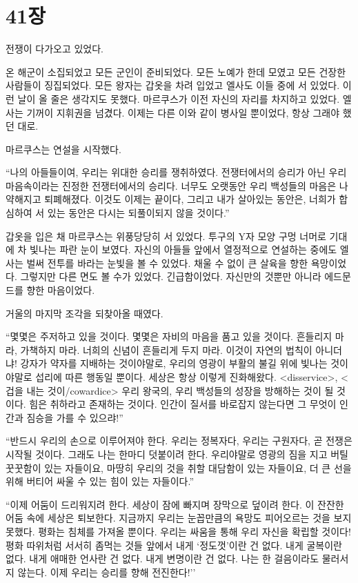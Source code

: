 ﻿
\chapter[41장  ~~][41장\hspace*{.5em}~~]{41장 \ ~~}



전쟁이 다가오고 있었다.

온 해군이 소집되었고 모든 군인이 준비되었다. 모든 노예가 한데 모였고 모든 건장한 사람들이 징집되었다. 모든 왕자는 갑옷을 차려 입었고 엘사도 이들 중에 서 있었다. 이런 날이 올 줄은 생각지도 못했다. 마르쿠스가 이전 자신의 자리를 차지하고 있었다. 엘사는 기꺼이 지휘권을 넘겼다. 이제는 다른 이와 같이 병사일 뿐이었다, 항상 그래야 했던 대로.

마르쿠스는 연설을 시작했다.

``나의 아들들이여, 우리는 위대한 승리를 쟁취하였다. 전쟁터에서의 승리가 아닌 우리 마음속이라는 진정한 전쟁터에서의 승리다. 너무도 오랫동안 우리 백성들의 마음은 나약해지고 퇴폐해졌다. 이것도 이제는 끝이다, 그리고 내가 살아있는 동안은, 너희가 합심하여 서 있는 동안은 다시는 되풀이되지 않을 것이다.''

갑옷을 입은 채 마르쿠스는 위풍당당히 서 있었다. 투구의 Y자 모양 구멍 너머로 기대에 차 빛나는 파란 눈이 보였다. 자신의 아들들 앞에서 열정적으로 연설하는 중에도 엘사는 벌써 전투를 바라는 눈빛을 볼 수 있었다. 채울 수 없이 큰 살육을 향한 욕망이었다. 그렇지만 다른 면도 볼 수가 있었다. 긴급함이었다. 자신만의 것뿐만 아니라 에드문드를 향한 마음이었다.

거울의 마지막 조각을 되찾아올 때였다.

``몇몇은 주저하고 있을 것이다. 몇몇은 자비의 마음을 품고 있을 것이다. 흔들리지 마라, 가책하지 마라. 너희의 신념이 흔들리게 두지 마라. 이것이 자연의 법칙이 아니더냐! 강자가 약자를 지배하는 것이야말로, 우리의 영광이 부활의 불길 위에 빛나는 것이야말로 섭리에 따른 행동일 뿐이다. 세상은 항상 이렇게 진화해왔다. <disservice>, <겁을 내는 것이/cowardice> 우리 왕국의, 우리 백성들의 성장을 방해하는 것이 될 것이다. 힘은 취하라고 존재하는 것이다. 인간이 질서를 바로잡지 않는다면 그 무엇이 인간과 짐승을 가를 수 있으랴!''

``반드시 우리의 손으로 이루어져야 한다. 우리는 정복자다, 우리는 구원자다, 곧 전쟁은 시작될 것이다. 그래도 나는 한마디 덧붙이려 한다. 우리야말로 영광의 짐을 지고 버틸 꿋꿋함이 있는 자들이요, 마땅히 우리의 것을 취할 대담함이 있는 자들이요, 더 큰 선을 위해 버티어 싸울 수 있는 힘이 있는 자들이다.''

``이제 어둠이 드리워지려 한다. 세상이 잠에 빠지며 장막으로 덮이려 한다. 이 잔잔한 어둠 속에 세상은 퇴보한다. 지금까지 우리는 눈꼽만큼의 욕망도 피어오르는 것을 보지 못했다. 평화는 침체를 가져올 뿐이다. 우리는 싸움을 통해 우리 자신을 확립할 것이다! 평화 따위처럼 서서히 좀먹는 것들 앞에서 내게 `정도껏'이란 건 없다. 내게 굴복이란 없다. 내게 애매한 언사란 건 없다. 내게 변명이란 건 없다. 나는 한 걸음이라도 물러서지 않는다. 이제 우리는 승리를 향해 전진한다!''

